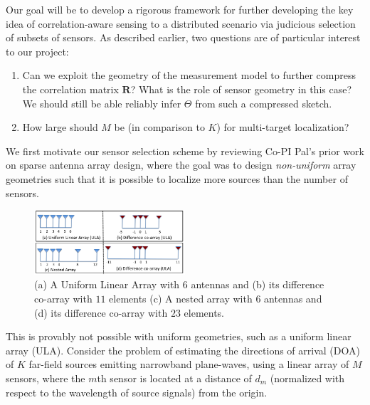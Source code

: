Our goal will be to develop a rigorous framework for further developing the key idea of correlation-aware sensing to a distributed scenario via judicious selection of subsets of sensors. As described earlier, two questions are of particular interest to our project:
\begin{enumerate}
\item Can we exploit the geometry of the measurement model to further compress the  correlation matrix $\mathbf{R}$? What is the role of sensor geometry in this case? We should still be able reliably infer $\Theta$ from such a compressed sketch.
\item How large should $M$ be (in comparison to $K$) for multi-target localization?
\end{enumerate}
We first motivate our sensor selection scheme by reviewing Co-PI Pal's prior work on sparse antenna array design, where the goal was to design {\em non-uniform} array geometries such that it is possible to localize more sources than the number of sensors. 
\begin{figure}
\begin{center}
\includegraphics[width=0.5\textwidth]{figs/FigNested.png}
\end{center}
\caption{\label{fig:Nested}  (a) A Uniform Linear Array with $6$ antennas and (b) its difference co-array with $11$ elements (c) A nested array with $6$ antennas and (d) its difference co-array with $23$ elements.}
\end{figure}
This is provably not possible with uniform geometries, such as a uniform linear array (ULA). Consider the problem of estimating the directions of arrival (DOA) of $K$ far-field sources emitting narrowband plane-waves, using a linear array of $M$ sensors, where the $m$th sensor is located at a distance of $d_m$ (normalized with respect to the wavelength of source signals) from the origin. 
